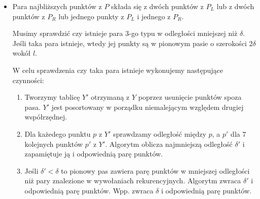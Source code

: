 \begin{itemize}
\begin{itemize}
		      \item[\uemph{Połącz:}] Para najbliższych punktów z $P$ składa się z dwóch punktów z $P_L$ lub z dwóch punktów
		            z $P_R$ lub jednego punkty z $P_L$ i jednego z $P_R$.

		            Musimy sprawdzić czy istnieje para 3-go typu w odległości mniejszej niż $\delta$.
		            Jeśli taka para istnieje, wtedy jej punkty są w pionowym pasie o szerokości $2\delta$
		            wokół $l$.

		            W celu sprawdzenia czy taka para istnieje wykonujemy następujące czynności:
		            \begin{enumerate}
			            \item Tworzymy tablicę $Y'$ otrzymaną z $Y$ poprzez usunięcie punktów spoza pasa. $Y'$ jest
			                  posortowany w porządku niemalejącym względem drugiej współrzędnej.
			            \item Dla każedego punktu $p$ z $Y'$ sprawdzamy odległość między $p$, a $p'$ dla $7$ kolejnych
			                  punktów $p'$ z $Y'$. Algorytm oblicza najmniejszą odległość $\delta'$ i zapamiętuje ją i odpowiednią
			                  parę punktów.
			            \item Jeśli $\delta' < \delta$ to pionowy pas zawiera parę punktów w mniejszej odległości niż pary znalezione
			                  w wywołaniach rekurencyjnych. Algorytm zwraca $\delta'$ i odpowiednią parę punktów. Wpp. zwraca $\delta$
			                  i odpowiednią parę punktów.
		            \end{enumerate}
	      \end{itemize}
\end{itemize}


